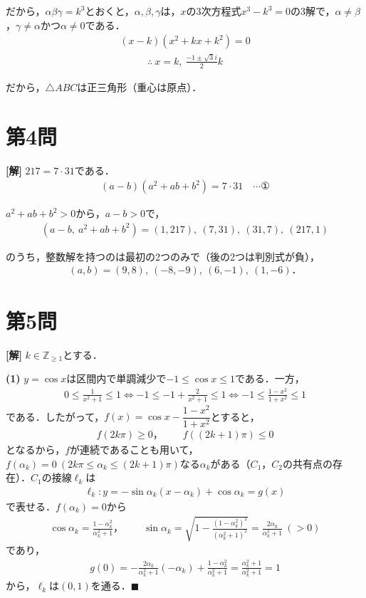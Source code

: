 \documentclass[../main.tex]{subfiles}
\begin{document}
だから，$\alpha\beta\gamma=k^3$とおくと，$\alpha,\beta,\gamma$は，$x$の3次方程式$x^3-k^3=0$の3解で，$\alpha\ne\beta$，$\gamma\ne\alpha$かつ$\alpha\ne0$である．
\begin{align*}
  (x-k)(x^2+kx+k^2)=0
\end{align*}
\begin{align*}
  \therefore\ x=k,\ \frac{-1\pm\sqrt3i}2k
\end{align*}

だから，$\triangle ABC$は正三角形（重心は原点）．

\newpage

\section*{第4問}

{\bf [解]}
$217=7\cdot31$である．
\begin{align*}
  (a-b)(a^2+ab+b^2)=7\cdot31\quad\cdots①
\end{align*}

$a^2+ab+b^2>0$から，$a-b>0$で，
\begin{align*}
  (a-b,\ a^2+ab+b^2)=(1,217),\ (7,31),\ (31,7),\ (217,1)
\end{align*}

のうち，整数解を持つのは最初の2つのみで（後の2つは判別式が負），
\begin{align*}
  (a,b)=(9,8),\ (-8,-9),\ (6,-1),\ (1,-6)．
\end{align*}

\newpage

\section*{第5問}

{\bf [解]}
$k\in\mathbb{Z}_{\ge1}$とする．

\textbf{(1)} $y=\cos x$は区間内で単調減少で$-1\le\cos x\le1$である．一方，
\begin{align*}
  0\le\frac1{x^2+1}\le1\iff-1\le-1+\frac2{x^2+1}\le1\iff-1\le\frac{1-x^2}{1+x^2}\le1
\end{align*}
である．したがって，$f(x)=\cos x-\dfrac{1-x^2}{1+x^2}$とすると，
\begin{align*}
  f(2k\pi)\ge0，\qquad f((2k+1)\pi)\le0
\end{align*}
となるから，$f$が連続であることも用いて，$f(\alpha_k)=0\ (2k\pi\le\alpha_k\le(2k+1)\pi)$なる$\alpha_k$がある（$C_1$，$C_2$の共有点の存在）．$C_1$の接線$\ell_k$は
\begin{align*}
  \ell_k:y=-\sin\alpha_k(x-\alpha_k)+\cos\alpha_k=g(x)
\end{align*}
で表せる．$f(\alpha_k)=0$から
\begin{align*}
  \cos\alpha_k=\frac{1-\alpha_k^2}{\alpha_k^2+1}，\qquad\sin\alpha_k=\sqrt{1-\frac{(1-\alpha_k^2)^2}{(\alpha_k^2+1)^2}}=\frac{2\alpha_k}{\alpha_k^2+1}\ (>0)
\end{align*}
であり，
\begin{align*}
  g(0)=-\frac{2\alpha_k}{\alpha_k^2+1}(-\alpha_k)+\frac{1-\alpha_k^2}{\alpha_k^2+1}=\frac{\alpha_k^2+1}{\alpha_k^2+1}=1
\end{align*}
から，$\ell_k$は$(0,1)$を通る．$\blacksquare$
\end{document}
